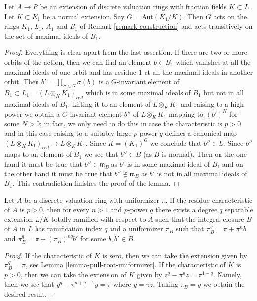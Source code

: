 \begin{lemma}
\label{lemma-galois-relative}
Let $A \to B$ be an extension of discrete valuation rings with fraction fields
$K \subset L$. Let $K \subset K_1$ be a normal extension. Say
$G = \text{Aut}(K_1/K)$. Then $G$ acts on the rings $K_1$, $L_1$,
$A_1$ and $B_1$ of Remark \ref{remark-construction}
and acts transitively on the set of maximal ideals of $B_1$.
\end{lemma}

\begin{proof}
Everything is clear apart from the last assertion. If there are two or
more orbits of the action, then we can find an element $b \in B_1$
which vanishes at all the maximal ideals of one orbit and has residue
$1$ at all the maximal ideals in another orbit. Then
$b' = \prod_{\sigma \in G} \sigma(b)$ is a $G$-invariant element of
$B_1 \subset L_1 = (L \otimes_K K_1)_{red}$ which is in some maximal
ideals of $B_1$
but not in all maximal ideals of $B_1$. Lifting it to an element of
$L \otimes_K K_1$ and raising to a high power we obtain a $G$-invariant
element $b''$ of $L \otimes_K K_1$ mapping to $(b')^N$ for some $N > 0$;
in fact, we only need to do this in case the characteristic is $p > 0$ and
in this case raising to a suitably large $p$-power $q$ defines a
canonical map $(L \otimes_K K_1)_{red} \to L \otimes_K K_1$.
Since $K = (K_1)^G$ we conclude that $b'' \in L$. Since $b''$ maps
to an element of $B_1$ we see that $b'' \in B$ (as $B$ is normal).
Then on the one hand it must be true that $b'' \in \mathfrak m_B$
as $b'$ is in some maximal ideal of $B_1$ and on the other hand it
must be true that $b'' \not \in \mathfrak m_B$ as $b'$ is not in
all maximal ideals of $B_1$. This contradiction finishes the proof of the
lemma.
\end{proof}

\begin{lemma}
\label{lemma-make-degree-q-extension}
Let $A$ be a discrete valuation ring with uniformizer $\pi$. If the residue
characteristic of $A$ is $p > 0$, then for every $n > 1$ and $p$-power $q$
there exists a degree $q$ separable extension $L/K$
totally ramified with respect to $A$
such that the integral closure $B$ of $A$ in $L$ has ramification index
$q$ and a uniformizer $\pi_B$ such that
$\pi_B^q = \pi + \pi^n b$ and $\pi_B^q = \pi + (\pi_B)^{nq}b'$
for some $b, b' \in B$.
\end{lemma}

\begin{proof}
If the characteristic of $K$ is zero, then we can take the
extension given by $\pi_B^q = \pi$, see
Lemma \ref{lemma-pull-root-uniformizer}.
If the characteristic of $K$ is $p > 0$, then we can take the
extension of $K$ given by $z^q - \pi^n z = \pi^{1 - q}$.
Namely, then we see that $y^q - \pi^{n + q - 1} y = \pi$
where $y = \pi z$. Taking $\pi_B = y$ we obtain the desired result.
\end{proof}

